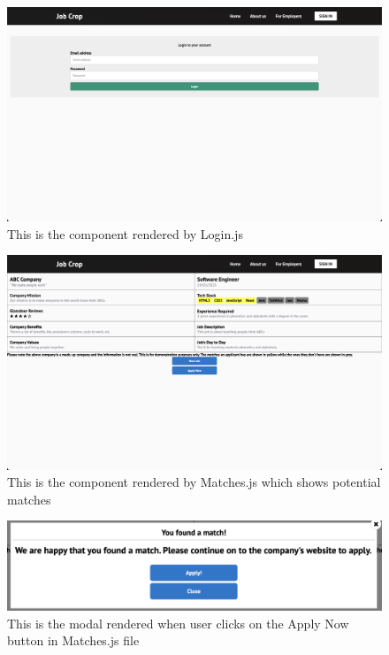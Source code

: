 \begin{figure}
    \centering
    \includegraphics[width = 140mm]{Figures/login.png}
    \caption{This is the component rendered by Login.js}
    \label{fig:login}
\end{figure}
\begin{figure}
    \centering
    \includegraphics[width = 140mm]{Figures/Matches.png}
    \caption{This is the component rendered by Matches.js which shows potential matches}
    \label{fig:Matches}
\end{figure}
\begin{figure}
    \centering
    \includegraphics[width = 140mm]{Figures/MatchFound.png}
    \caption{This is the modal rendered when user clicks on the Apply Now button in Matches.js file}
    \label{fig:MatchFound}
\end{figure}
